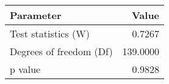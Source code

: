 \begin{tabular}{lr}
\toprule
               Parameter &     Value \\
\midrule
     Test statistics (W) &    0.7267 \\
 Degrees of freedom (Df) &  139.0000 \\
                 p value &    0.9828 \\
\bottomrule
\end{tabular}
